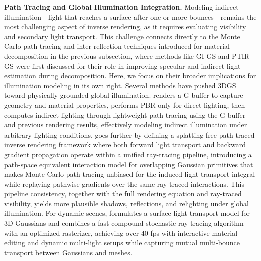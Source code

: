 \documentclass[11pt]{article}
\begin{document}
\textbf{Path Tracing and Global Illumination Integration.} Modeling indirect illumination---light that reaches a surface after one or more bounces---remains the most challenging aspect of inverse rendering, as it requires evaluating visibility and secondary light transport. This challenge connects directly to the Monte Carlo path tracing and inter-reflection techniques introduced for material decomposition in the previous subsection, where methods like GI-GS and PTIR-GS were first discussed for their role in improving specular and indirect light estimation during decomposition. Here, we focus on their broader implications for illumination modeling in its own right. Several methods have pushed 3DGS toward physically grounded global illumination. \cite{ref571} renders a G-buffer to capture geometry and material properties, performs PBR only for direct lighting, then computes indirect lighting through lightweight path tracing using the G-buffer and previous rendering results, effectively modeling indirect illumination under arbitrary lighting conditions. \cite{ref573} goes further by defining a splatting-free path-traced inverse rendering framework where both forward light transport and backward gradient propagation operate within a unified ray-tracing pipeline, introducing a path-space equivalent interaction model for overlapping Gaussian primitives that makes Monte-Carlo path tracing unbiased for the induced light-transport integral while replaying pathwise gradients over the same ray-traced interactions. This pipeline consistency, together with the full rendering equation and ray-traced visibility, yields more plausible shadows, reflections, and relighting under global illumination. For dynamic scenes, \cite{ref587} formulates a surface light transport model for 3D Gaussians and combines a fast compound stochastic ray-tracing algorithm with an optimized rasterizer, achieving over 40 fps with interactive material editing and dynamic multi-light setups while capturing mutual multi-bounce transport between Gaussians and meshes.
\end{document}
